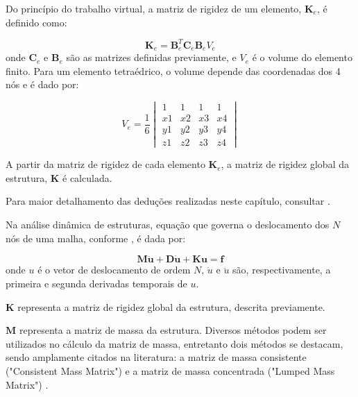 Do princípio do trabalho virtual, a matriz de rigidez de um elemento,  $\pmb{K}_{e}$, é definido como:

\begin{equation} \label{eq:elementrig}
    \pmb{K}_{e} = \pmb{B}^{T}_{e}\pmb{C}_{e}\pmb{B}_{e}V_{e} 
\end{equation}
onde $\pmb{C}_{e}$ e $\pmb{B}_{e}$ são as matrizes definidas previamente, e $V_{e}$ é o volume do elemento finito. Para um elemento tetraédrico, o volume depende das coordenadas dos 4 nós e é dado por:

\begin{equation} \label{eq:volume}
V_{e} = \frac{1}{6} 
\begin{vmatrix}
 1 & 1 & 1 & 1 \\
 x1 & x2 & x3 & x4 \\
 y1 & y2 & y3 & y4 \\
 z1 & z2 & z3 & z4 
\end{vmatrix}
\end{equation}

A partir da matriz de rigidez de cada elemento $\pmb{K}_{e}$, a matriz de rigidez global da estrutura, $\pmb{K}$ é calculada.

Para maior detalhamento das deduções realizadas neste capítulo, consultar \cite{Chen2017numerical}.

Na análise dinâmica de estruturas, equação que governa o deslocamento dos $N$ nós de uma malha, conforme \cite{hughes2012finite}, é dada por:

\begin{equation} \label{eq:dynamic}
\pmb{M}\ddot{\pmb{u}} + \pmb{D}\dot{\pmb{u}} + \pmb{K}\pmb{u} = \pmb{f} 
\end{equation}
onde $u$ é o vetor de deslocamento de ordem $N$, $\dot{u}$ e $\ddot{u}$ são, respectivamente, a primeira e segunda derivadas temporais de $u$.

$\pmb{K}$ representa a matriz de rigidez global da estrutura, descrita previamente.

$\pmb{M}$ representa a matriz de massa da estrutura. 
Diversos métodos podem ser utilizados no cálculo da matriz de massa, entretanto dois métodos se destacam, sendo amplamente citados na literatura: a matriz de massa consistente ("Consistent Mass Matrix")  e a matriz de massa concentrada ("Lumped Mass Matrix") \cite{felippa2004introduction}.



